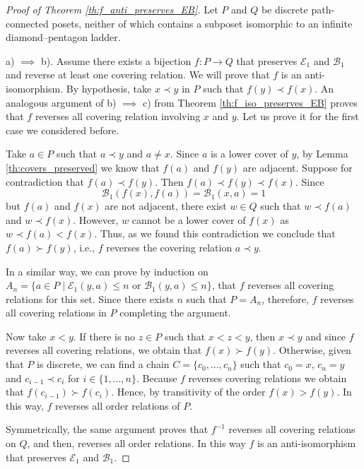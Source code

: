 \documentclass{article}[12pt]
\theoremstyle{exampstyle}
\theoremstyle{remark}
\newcommand{\B}{\mathcal{B}}
\newcommand{\E}{\mathcal{E}}
\newcommand{\tuple}[3][1]{#2_{#1}, \dots , #2_{#3}}
\begin{document}
\begin{proof}[Proof of Theorem \ref{th:f_anti_preserves_EB}]
    Let $P$ and $Q$ be discrete path-connected posets, neither of which contains a subposet isomorphic to an infinite diamond–pentagon ladder.
    
    a) $\implies$ b). Assume there exists a bijection $f: P \to Q$ that preserves $\E_1$ and $\B_1$ and reverse at least one covering relation. We will prove that $f$ is an anti-isomorphism. By hypothesis, take $x \prec y$ in $P$ such that $f(y) \prec f(x)$. An analogous argument of b) $\implies$ c) from Theorem \ref{th:f_iso_preserves_EB} proves that $f$ reverses all covering relation involving $x$ and $y$. Let us prove it for the first case we considered  before.
    
   Take $a \in P$  such that $a \prec y$ and $a \neq x$. Since $a$ is a lower cover of $y$,  by Lemma \ref{th:covers_preserved} we know that $f(a)$ and $f(y)$ are adjacent. Suppose for contradiction that $f(a) \prec f(y)$. Then $f(a) \prec f(y) \prec f(x)$. Since 
    \[\B_1(f(x),f(a)) = \B_1(x,a) =1 \]
    but $f(a)$ and $f(x)$ are not adjacent, there exist $w \in Q$ such that $w \prec f(a)$ and $w \prec f(x)$. However, $w$ cannot be a lower cover of $f(x)$ as $w \prec f(a) < f(x)$. Thus, as we found this contradiction we conclude that $f(a) \succ f(y)$, i.e., $f$ reverses the covering relation $a  \prec y$.

    In a similar way, we can prove by induction on $A_n = \{ a \in P \mid \E_1(y,a) \leq n \text{ or } \B_1(y,a) \leq n\}$, that $f$ reverses all covering relations for this set. Since there exists $n$ such that $P = A_n$,  therefore, $f$ reverses all covering relations in $P$ completing the argument.

    Now take $x < y $. If there is no $z \in P$ such that $x < z < y$, then $x \prec y$ and since $f$ reverses all covering relations, we obtain that $f(x) \succ f(y)$. Otherwise,  given that $P$ is discrete, we can find a chain $C = \{\tuple[0]{c}{n}\}$ such that $c_0 = x$, $c_n = y$ and $c_{i-1} \prec c_i$ for $i \in \{ 1, ..., n\}$. Because  $f$ reverses covering relations we obtain that $f(c_{i-1}) \succ f(c_i)$. Hence, by transitivity of the order $f(x) > f(y)$. In this way, $f$ reverses all order relations of $P$.

    Symmetrically, the same argument proves that $f^{-1}$ reverses all covering relations on $Q$, and then, reverses all order relations. In this way $f$ is an anti-isomorphism that preserves $\E_1$ and $\B_1$.


\end{proof}
\end{document}
